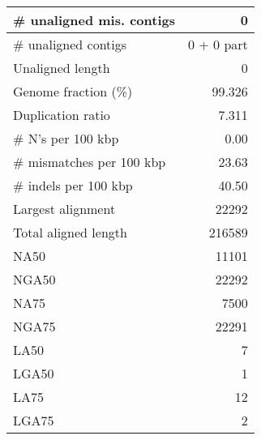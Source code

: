 \documentclass[12pt,a4paper]{article}
\begin{document}
\begin{table}[ht]
\begin{center}
\begin{tabular}{|l*{1}{|r}|}
\# unaligned mis. contigs & 0 \\ \hline
\# unaligned contigs & 0 + 0 part \\ \hline
Unaligned length & 0 \\ \hline
Genome fraction (\%) & 99.326 \\ \hline
Duplication ratio & 7.311 \\ \hline
\# N's per 100 kbp & 0.00 \\ \hline
\# mismatches per 100 kbp & 23.63 \\ \hline
\# indels per 100 kbp & 40.50 \\ \hline
Largest alignment & 22292 \\ \hline
Total aligned length & 216589 \\ \hline
NA50 & 11101 \\ \hline
NGA50 & 22292 \\ \hline
NA75 & 7500 \\ \hline
NGA75 & 22291 \\ \hline
LA50 & 7 \\ \hline
LGA50 & 1 \\ \hline
LA75 & 12 \\ \hline
LGA75 & 2 \\ \hline
\end{tabular}
\end{center}
\end{table}
\end{document}
